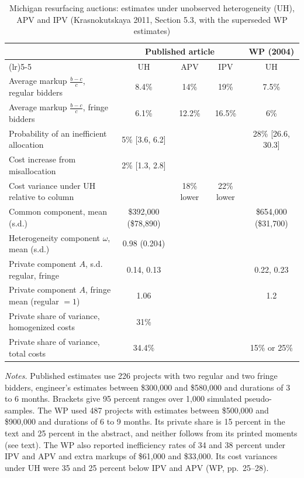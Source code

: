 \begin{table}[htbp]
\centering
\caption{Michigan resurfacing auctions: estimates under unobserved heterogeneity (UH), APV and IPV
(Krasnokutskaya 2011, Section 5.3, with the superseded WP estimates)}
\label{tab:15-krasno-results}
{\small
\begin{tabularx}{\textwidth}{>{\raggedright\arraybackslash}Xcccc}
\toprule
 & \multicolumn{3}{c}{Published article} & WP (2004)\\
\cmidrule(lr){2-4}\cmidrule(lr){5-5}
 & UH & APV & IPV & UH\\
\midrule
Average markup $\frac{b-c}{c}$, regular bidders & 8.4\% & 14\% & 19\% & 7.5\%\\
Average markup $\frac{b-c}{c}$, fringe bidders & 6.1\% & 12.2\% & 16.5\% & 6\%\\
Probability of an inefficient allocation & 5\% [3.6, 6.2] & & & 28\% [26.6, 30.3]\\
Cost increase from misallocation & 2\% [1.3, 2.8] & & & \\
Cost variance under UH relative to column & & 18\% lower & 22\% lower & \\
\addlinespace
Common component, mean (s.d.) & \$392,000 (\$78,890) & & & \$654,000 (\$31,700)\\
Heterogeneity component $\omega$, mean (s.d.) & 0.98 (0.204) & & & \\
Private component $A$, s.d. regular, fringe & 0.14, 0.13 & & & 0.22, 0.23\\
Private component $A$, fringe mean (regular $=1$) & 1.06 & & & 1.2\\
Private share of variance, homogenized costs & 31\% & & & \\
Private share of variance, total costs & 34.4\% & & & 15\% or 25\%\\
\bottomrule
\end{tabularx}}

\smallskip
\begin{minipage}{0.93\textwidth}
\footnotesize \textit{Notes.} Published estimates use 226 projects with two regular and two fringe bidders,
engineer's estimates between \$300,000 and \$580,000 and durations of 3 to 6 months. Brackets give 95
percent ranges over 1,000 simulated pseudo-samples. The WP used 487 projects with estimates between
\$500,000 and \$900,000 and durations of 6 to 9 months. Its private share is 15 percent in the text and
25 percent in the abstract, and neither follows from its printed moments (see text). The WP also
reported inefficiency rates of 34 and 38 percent under IPV and APV and extra markups of \$61,000 and
\$33,000. Its cost variances under UH were 35 and 25 percent below IPV and APV (WP, pp.~25--28).
\end{minipage}
\end{table}

